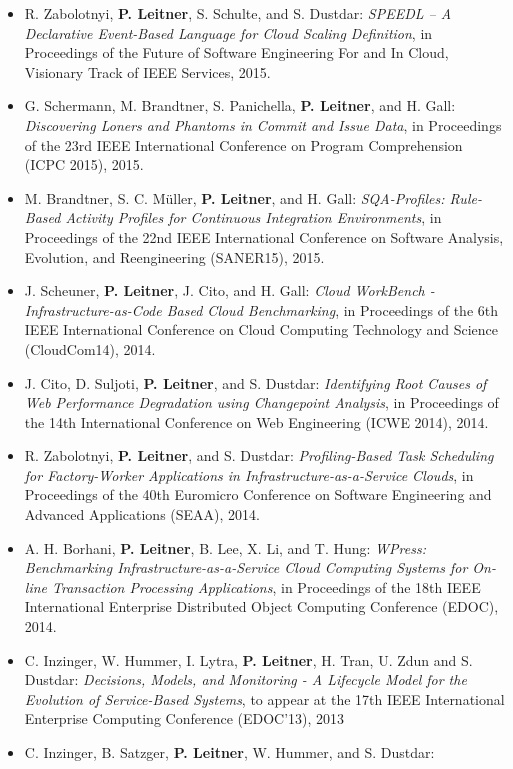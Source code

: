 \documentclass[paper=letter,fontsize=11pt]{scrartcl} %
\begin{document}
\begin{itemize}
\begin{shaded}
        \end{shaded}
      \item R. Zabolotnyi, \textbf{P. Leitner}, S. Schulte, and S. Dustdar: \emph{SPEEDL -- A Declarative Event-Based Language for Cloud Scaling Definition}, in Proceedings of the Future of Software Engineering For and In Cloud, Visionary Track of IEEE Services, 2015.
  \item G. Schermann, M. Brandtner, S. Panichella, \textbf{P. Leitner}, and H. Gall: \emph{Discovering Loners and Phantoms in Commit and Issue Data}, in Proceedings of the 23rd IEEE International Conference
on Program Comprehension (ICPC 2015), 2015.
  \item M. Brandtner, S. C. M\"uller, \textbf{P. Leitner}, and H. Gall: \emph{SQA-Profiles: Rule-Based Activity Profiles for Continuous Integration Environments}, in Proceedings of the 22nd IEEE International Conference on Software Analysis, Evolution, and Reengineering (SANER15), 2015.
  \item J. Scheuner, \textbf{P. Leitner}, J. Cito, and H. Gall: \emph{Cloud WorkBench - Infrastructure-as-Code Based Cloud Benchmarking}, in Proceedings of the 6th IEEE International Conference on Cloud Computing Technology and Science (CloudCom14), 2014.
  \item J. Cito, D. Suljoti, \textbf{P. Leitner}, and S. Dustdar: \emph{Identifying Root Causes of Web Performance Degradation using Changepoint Analysis}, in Proceedings of the 14th International Conference on Web Engineering (ICWE 2014), 2014.
 \item R. Zabolotnyi, \textbf{P. Leitner}, and S. Dustdar: \emph{Profiling-Based Task Scheduling for Factory-Worker Applications in Infrastructure-as-a-Service Clouds}, in Proceedings of the 40th Euromicro Conference on Software Engineering and Advanced Applications (SEAA), 2014.
 \item A. H. Borhani, \textbf{P. Leitner}, B. Lee, X. Li, and T. Hung: \emph{WPress: Benchmarking Infrastructure-as-a-Service Cloud Computing Systems for On-line Transaction Processing Applications}, in Proceedings of the 18th IEEE International Enterprise Distributed Object Computing Conference (EDOC), 2014.
\item C. Inzinger, W. Hummer, I. Lytra, \textbf{P. Leitner}, H. Tran, U. Zdun and S. Dustdar: \emph{Decisions, Models, and Monitoring - A Lifecycle Model for the Evolution of Service-Based Systems}, to appear at the 17th IEEE International Enterprise Computing Conference (EDOC'13), 2013
\item C. Inzinger, B. Satzger, \textbf{P. Leitner}, W. Hummer, and S. Dustdar:

\end{itemize}
\end{document}

